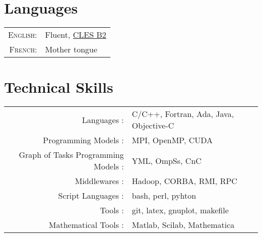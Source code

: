 \documentclass[a4paper,10pt]{article} %
\begin{document}




\section{Languages}

\begin{tabular}{rl}
\textsc{English:}   & Fluent, \href{http://www.certification-cles.fr}{CLES B2}\\
\textsc{French:}    & Mother tongue\\
\end{tabular}


\section{Technical Skills}

\begin{tabular}{rl}
Languages :                         & C/C++, Fortran, Ada, Java, Objective-C  \\
Programming Models :                & MPI, OpenMP, CUDA                       \\
Graph of Tasks Programming Models : & YML, OmpSs, CnC                         \\
Middlewares :                       & Hadoop, CORBA, RMI, RPC                 \\
Script Languages :                  & bash, perl, pyhton                      \\
Tools :                             & git, latex, gnuplot, makefile           \\
Mathematical Tools :                & Matlab, Scilab, Mathematica             \\
\end{tabular}
\end{document}
